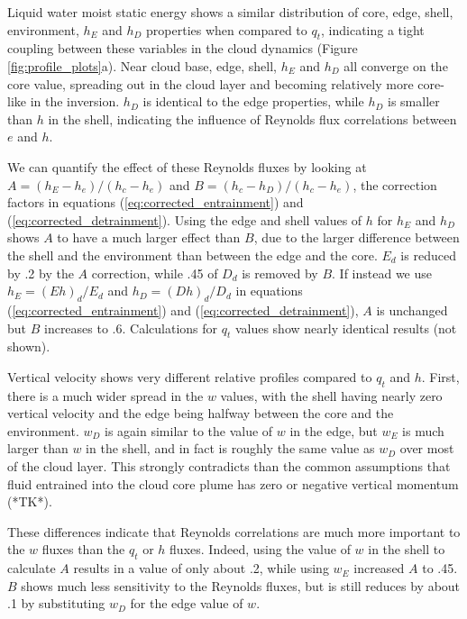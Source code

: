 \documentclass[draft,grl]{agutex}
\begin{document}
\begin{article}
Liquid water moist static energy shows a similar distribution of core, edge, 
shell, environment, $h_E$ and $h_D$ properties when compared to $q_t$, 
indicating a tight coupling between these variables in the cloud dynamics 
(Figure \ref{fig:profile_plots}a).  Near cloud base, edge, shell, $h_E$ and 
$h_D$ all converge on the core value, spreading out in the cloud layer and 
becoming relatively more core-like in the inversion.  $h_D$ is identical to the 
edge properties, while $h_D$ is smaller than $h$ in the shell, indicating the 
influence of Reynolds flux correlations between $e$ and $h$.

We can quantify the effect of these Reynolds fluxes by looking at 
$A = (h_E - h_e)/(h_c - h_e)$ and $B = (h_c - h_D)/(h_c - h_e)$, the correction 
factors in equations (\ref{eq:corrected_entrainment}) and 
(\ref{eq:corrected_detrainment}).  Using the edge and shell values of $h$ for 
$h_E$ and $h_D$ shows $A$ to have a much larger effect than $B$, due to the 
larger difference between the shell and the environment than between the edge 
and the core.  $E_d$ is reduced by .2 by the $A$ correction, while .45 of
$D_d$ is removed by $B$.  If instead we use $h_E = (E h)_d/E_d$ and 
$h_D = (D h)_d/D_d$ in equations (\ref{eq:corrected_entrainment}) and 
(\ref{eq:corrected_detrainment}), $A$ is unchanged but $B$ increases to .6.  
Calculations for $q_t$ values show nearly identical results (not shown).

Vertical velocity shows very different relative profiles compared to $q_t$ and 
$h$.  First, there is a much wider spread in the $w$ values, with the shell 
having nearly zero vertical velocity and the edge being halfway between the 
core and the environment.  $w_D$ is again similar to the value of $w$ in the 
edge, but $w_E$ is much larger than $w$ in the shell, and in fact is roughly 
the same value as $w_D$ over most of the cloud layer.  This strongly 
contradicts than the common assumptions that fluid entrained into the cloud 
core plume has zero or negative vertical momentum (*TK*).

These differences indicate that Reynolds correlations are much more important 
to the $w$ fluxes than the $q_t$ or $h$ fluxes.  Indeed, using the value 
of $w$ in the shell to calculate $A$ results in a value of only about .2, while
using $w_E$ increased $A$ to .45.  $B$ shows much less sensitivity to the 
Reynolds fluxes, but is still reduces by about .1 by substituting $w_D$ for the 
edge value of $w$.



\end{article}
\end{document}
